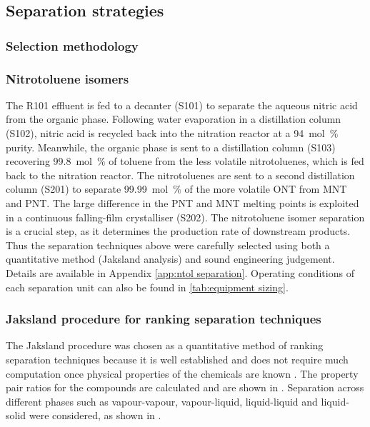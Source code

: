 \subsection{Separation strategies}

\subsubsection{Selection methodology}

\subsubsection{Nitrotoluene isomers}

The R101 effluent is fed to a decanter (S101) to separate the aqueous nitric acid from the organic phase. Following water evaporation in a distillation column (S102), nitric acid is recycled back into the nitration reactor at a \SI{94}{mol\percent} purity.
Meanwhile, the organic phase is sent to a distillation column (S103) recovering \SI{99.8}{mol\percent} of toluene from the less volatile nitrotoluenes, which is fed back to the nitration reactor. The nitrotoluenes are sent to a second distillation column (S201) to separate \SI{99.99}{mol\percent} of the more volatile ONT from MNT and PNT. The large difference in the PNT and MNT melting points is exploited in a continuous falling-film crystalliser (S202). 
The nitrotoluene isomer separation is a crucial step, as it determines the production rate of downstream products. Thus the separation techniques above were carefully selected using both a quantitative method (Jaksland analysis) \cite{jaksland_separation_1995} and sound engineering judgement. Details are available in Appendix \ref{app:ntol separation}. Operating conditions of each separation unit can also be found in \cref{tab:equipment sizing}. 

\label{app:ntol separation}
\subsubsection{Jaksland procedure for ranking separation techniques}
The Jaksland procedure was chosen as a quantitative method of ranking separation techniques because it is well established and does not require much computation once physical properties of the chemicals are known \cite{jaksland_separation_1995}. The property pair ratios for the compounds are calculated and are shown in . Separation across different phases such as vapour-vapour, vapour-liquid, liquid-liquid and liquid-solid were considered, as shown in .

